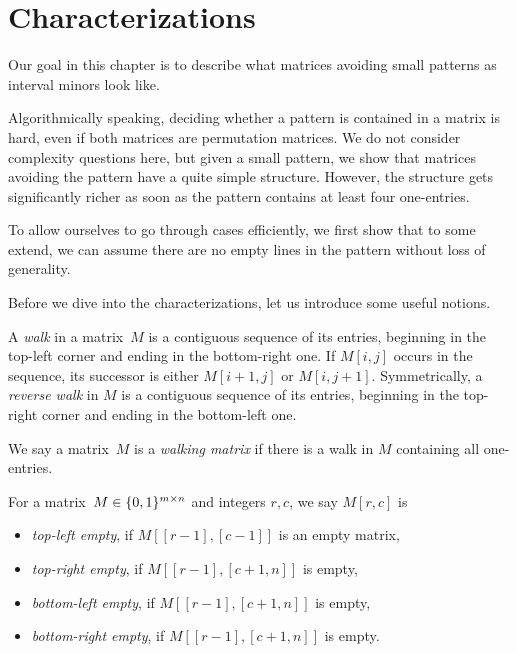 \newsavebox{\smlmat}
\savebox{\smlmat}{$\smm{\bullet&\bullet\\\bullet& }$}
\newsavebox{\smlmatb}
\savebox{\smlmatb}{$\smm{\bullet&\bullet\\\bullet&\bullet}$}
\newsavebox{\smlmatc}
\savebox{\smlmatc}{$\smm{\bullet&\bullet&\bullet\\ &\bullet& }$}

\chapter{Characterizations}
\label{chap:chars}
Our goal in this chapter is to describe what matrices avoiding small patterns as interval minors look like.

Algorithmically speaking, deciding whether a pattern is contained in a matrix is hard, even if both matrices are permutation matrices. We do not consider complexity questions here, but given a small pattern, we show that matrices avoiding the pattern have a quite simple structure. However, the structure gets significantly richer as soon as the pattern contains at least four one-entries.

To allow ourselves to go through cases efficiently, we first show that to some extend, we can assume there are no empty lines in the pattern without loss of generality.

Before we dive into the characterizations, let us introduce some useful notions.

\begin{defn}
A \emph{walk} in a matrix~$M$ is a contiguous sequence of its entries, beginning in the top-left corner and ending in the bottom-right one. If $M[i,j]$ occurs in the sequence, its successor is either $M[i+1,j]$ or $M[i,j+1]$. Symmetrically, a \emph{reverse walk} in $M$ is a contiguous sequence of its entries, beginning in the top-right corner and ending in the bottom-left one.
\end{defn}

\begin{defn}
We say a matrix~$M$ is a \emph{walking matrix} if there is a walk in $M$ containing all one-entries.
\end{defn}

\begin{defn}
For a matrix~$M\in\{0,1\}^{m\times n}$ and integers $r,c$, we say $M[r,c]$ is
\begin{itemize}
	\item \emph{top-left empty}, if $M[[r-1],[c-1]]$ is an empty matrix,
	\item \emph{top-right empty}, if $M[[r-1],[c+1,n]]$ is empty,
	\item \emph{bottom-left empty}, if $M[[r-1],[c+1,n]]$ is empty,
	\item \emph{bottom-right empty}, if $M[[r-1],[c+1,n]]$ is empty.
\end{itemize}
\end{defn}


